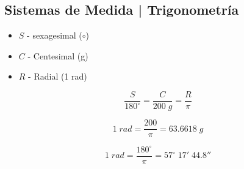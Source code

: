 \documentclass[12pt, a5paper]{article}
\begin{document}
\subsection*{Sistemas de Medida | Trigonometría}	

\begin{itemize}
\item{$S$ - sexagesimal ($\circ$)}
\item{$C$ - Centesimal (g)}
\item{$R$ - Radial (1 rad)}
\end{itemize}

$$
\boxed{ \dfrac{S}{180^\circ} = \dfrac{C}{200\;g } = \dfrac{R}{\pi} }
$$

$$
1\;rad = \dfrac{200}{\pi} = 63{.}6618\;g
$$

$$
1\;rad = \dfrac{180^\circ}{\pi} = 57^\circ\;17'\;44{.}8''
$$
\end{document}
